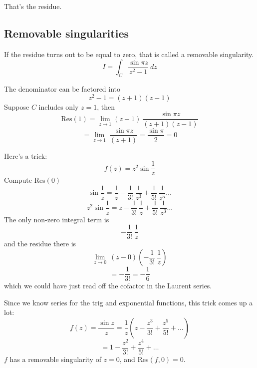 \documentclass[11pt, oneside]{article}
\begin{document}
That's the residue.

\subsection*{Removable singularities}
If the residue turns out to be equal to zero, that is called a removable singularity.  
\[ I = \int_C \frac{\sin \pi z}{z^2 - 1} \ dz \]

The denominator can be factored into 
\[ z^2 - 1 = (z + 1)(z - 1) \]
Suppose $C$ includes only $z = 1$, then
\[ \text{Res}(1) = \lim_{z \rightarrow 1}  (z-1) \ \frac{\sin \pi z}{(z + 1)(z - 1)} \]
\[ = \lim_{z \rightarrow 1} \ \frac{\sin \pi z}{(z + 1)} = \frac{\sin \pi}{2} =  0 \]

Here's a trick:
\[ f(z) = z^2 \sin \frac{1}{z} \]
Compute Res$(0)$
\[ \sin \frac{1}{z} = \frac{1}{z} - \frac{1}{3!} \ \frac{1}{z^3} + \frac{1}{5!} \ \frac{1}{z^5} \dots \]
\[ z^2 \sin \frac{1}{z} = z - \frac{1}{3!} \ \frac{1}{z} + \frac{1}{5!} \ \frac{1}{z^3} \dots \]
The only non-zero integral term is 
\[ - \frac{1}{3!} \ \frac{1}{z} \]
and the residue there is
\[ \lim_{z \rightarrow 0} \ (z - 0) (- \frac{1}{3!} \ \frac{1}{z}) \]
\[ = - \frac{1}{3!} = - \frac{1}{6} \]
which we could have just read off the cofactor in the Laurent series.

Since we know series for the trig and exponential functions, this trick comes up a lot:
\[ f(z) = \frac{\sin z}{z} = \frac{1}{z} (z - \frac{z^3}{3!} + \frac{z^5}{5!} + \dots) \]
\[ = 1 - \frac{z^2}{3!} + \frac{z^4}{5!} + \dots \]
$f$ has a removable singularity of $z = 0$, and Res$(f,0) = 0$.
\end{document}
